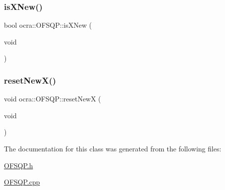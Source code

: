 \subsubsection{\texorpdfstring{is\+X\+New()}{isXNew()}}
{\footnotesize\ttfamily bool ocra\+::\+O\+F\+S\+Q\+P\+::is\+X\+New (\begin{DoxyParamCaption}\item[{void}]{ }\end{DoxyParamCaption})}

\hypertarget{classocra_1_1OFSQP_addab1dbba87610a532df2f0a279629be}{}\label{classocra_1_1OFSQP_addab1dbba87610a532df2f0a279629be} 
\subsubsection{\texorpdfstring{reset\+New\+X()}{resetNewX()}}
{\footnotesize\ttfamily void ocra\+::\+O\+F\+S\+Q\+P\+::reset\+NewX (\begin{DoxyParamCaption}\item[{void}]{ }\end{DoxyParamCaption})}



The documentation for this class was generated from the following files\+:\begin{DoxyCompactItemize}
\item 
\hyperlink{OFSQP_8h}{O\+F\+S\+Q\+P.\+h}\item 
\hyperlink{OFSQP_8cpp}{O\+F\+S\+Q\+P.\+cpp}\end{DoxyCompactItemize}

